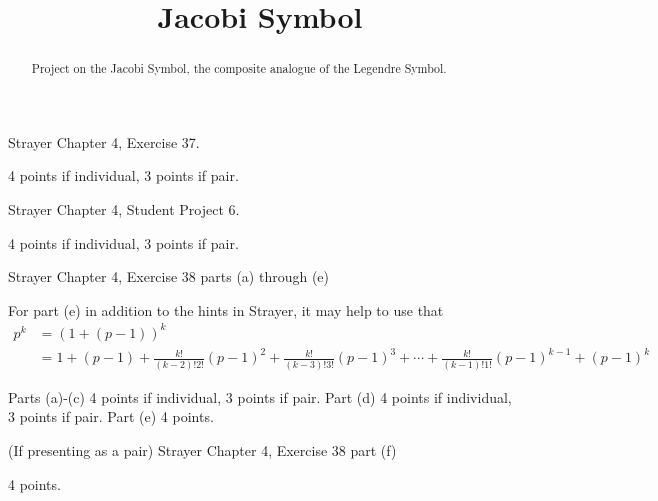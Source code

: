 \documentclass[letterpaper, 11 pt,handout,hints]{ximera}
\title{Jacobi Symbol}
\begin{document}
\begin{abstract}
 Project on the Jacobi Symbol, the composite analogue of the Legendre Symbol.
\end{abstract}
\maketitle




\begin{exploration}
 
\begin{problem}
 Strayer Chapter 4, Exercise 37.
 
\begin{rubric}
 4 points if individual, 3 points if pair.
\end{rubric}
 \end{problem}

\begin{problem}
 Strayer Chapter 4, Student Project 6.
 \begin{rubric}
 4 points if individual, 3 points if pair.
\end{rubric}
\end{problem}

\begin{problem}
  Strayer Chapter 4, Exercise 38 parts (a) through (e)   
  
  For part (e) in addition to the hints in Strayer, it may help to use that 
	\begin{align*}
		p^k&=\left(1+(p-1)\right)^k\\
		&=1+(p-1)+\frac{k!}{(k -2)! 2!}(p-1)^2
		+\frac{k!}{(k -3)! 3!}(p-1)^3+\cdots
		+\frac{k!}{(k -1)! 1!}(p-1)^{k-1}
		+(p-1)^k
	\end{align*}
\begin{rubric}
 Parts (a)-(c) 4 points if individual, 3 points if pair.  Part (d) 4 points if individual, 3 points if pair. Part (e) 4 points.
\end{rubric}
\end{problem}

\begin{problem}(If presenting as a pair)
Strayer Chapter 4, Exercise 38 part (f)
\begin{rubric}
4 points.
\end{rubric}
\end{problem}
\end{exploration}
\end{document}

